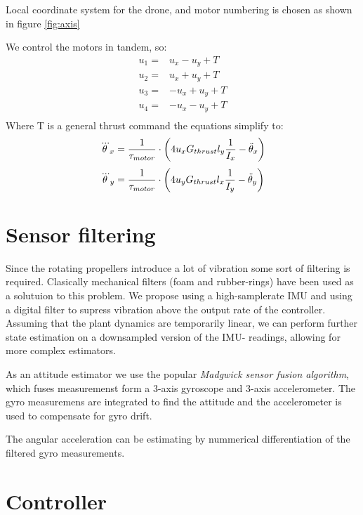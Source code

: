 Local coordinate system for the drone, and motor numbering is chosen as shown in
figure \ref{fig:axis}

We control the motors in tandem, so:
\begin{align}
u_1 = & u_x - u_y + T\\
u_2 = & u_x + u_y + T\\
u_3 = & -u_x + u_y + T\\
u_4 = & -u_x - u_y + T\\
\end{align}
Where T is a general thrust command the equations simplify to:
\begin{equation}
 \dddot\theta_x = \frac{1}{\tau_{motor}} \cdot \left(
 4 u_x G_{thrust} l_{y} \frac{ 1 }{ I_{x} }  - \ddot\theta_x
 \right) 
\end{equation}
\begin{equation}
 \dddot\theta_y = \frac{1}{\tau_{motor}} \cdot \left(
4 u_y G_{thrust} l_{x} \frac{ 1 }{ I_{y} }  - \ddot\theta_y
 \right) 
\end{equation}


\section{ Sensor filtering } %
Since the rotating propellers introduce a lot of vibration some sort of
filtering is required. Clasically mechanical filters (foam and rubber-rings) have
been used as a solutuion to this problem. We propose using a high-samplerate
IMU and using a digital filter to supress vibration above the output rate of the
controller. Assuming that the plant dynamics are temporarily linear, we can
perform further state estimation on a downsampled version of the IMU- readings,
allowing for more complex estimators.

As an attitude estimator we use the popular \emph{Madgwick sensor fusion
algorithm}\cite{Madgwick2011}, which
fuses measuremenst form a 3-axis gyroscope and 3-axis accelerometer. The gyro measuremens are integrated to find the attitude and the
accelerometer is used to compensate for gyro drift.

The angular acceleration can be estimating by nummerical differentiation of the
filtered gyro measurements.

\section{ Controller } %

